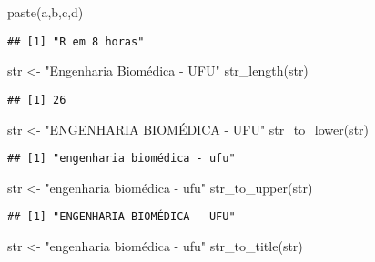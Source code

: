 \documentclass[
]{article}
\newenvironment{Shaded}{\begin{snugshade}}{\end{snugshade}}
\newcommand{\FunctionTok}[1]{\textcolor[rgb]{0.00,0.00,0.00}{#1}}
\newcommand{\NormalTok}[1]{#1}
\newcommand{\OtherTok}[1]{\textcolor[rgb]{0.56,0.35,0.01}{#1}}
\newcommand{\StringTok}[1]{\textcolor[rgb]{0.31,0.60,0.02}{#1}}
\begin{document}
\begin{Shaded}
\begin{Highlighting}[]
\FunctionTok{paste}\NormalTok{(a,b,c,d)}
\end{Highlighting}
\end{Shaded}

\begin{verbatim}
## [1] "R em 8 horas"
\end{verbatim}

\begin{Shaded}
\begin{Highlighting}[]
\NormalTok{str }\OtherTok{\textless{}{-}} \StringTok{"Engenharia Biomédica {-} UFU"}
\FunctionTok{str\_length}\NormalTok{(str)}
\end{Highlighting}
\end{Shaded}

\begin{verbatim}
## [1] 26
\end{verbatim}

\begin{Shaded}
\begin{Highlighting}[]
\NormalTok{str }\OtherTok{\textless{}{-}} \StringTok{"ENGENHARIA BIOMÉDICA {-} UFU"}
\FunctionTok{str\_to\_lower}\NormalTok{(str)}
\end{Highlighting}
\end{Shaded}

\begin{verbatim}
## [1] "engenharia biomédica - ufu"
\end{verbatim}

\begin{Shaded}
\begin{Highlighting}[]
\NormalTok{str }\OtherTok{\textless{}{-}} \StringTok{"engenharia biomédica {-} ufu"}
\FunctionTok{str\_to\_upper}\NormalTok{(str)}
\end{Highlighting}
\end{Shaded}

\begin{verbatim}
## [1] "ENGENHARIA BIOMÉDICA - UFU"
\end{verbatim}

\begin{Shaded}
\begin{Highlighting}[]
\NormalTok{str }\OtherTok{\textless{}{-}} \StringTok{"engenharia biomédica {-} ufu"}
\FunctionTok{str\_to\_title}\NormalTok{(str)}
\end{Highlighting}
\end{Shaded}
\end{document}
